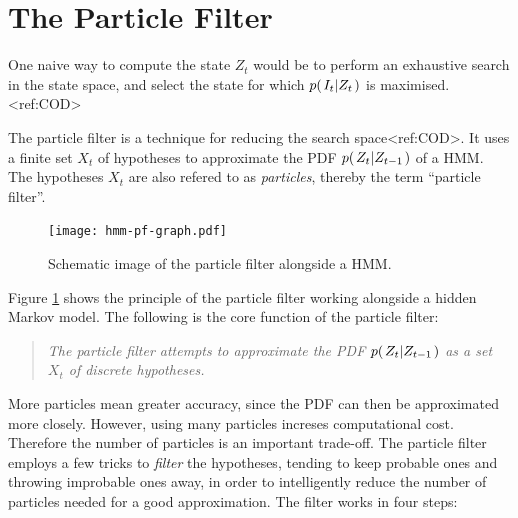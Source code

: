 %
%

%
%

%
%


\section{The Particle Filter}

One naive way to compute the state $Z_t$ would be to perform an
exhaustive search in the state space, and select the state for which
$p{(\left. I_t \middle\vert Z_t \right.)}$ is maximised.<ref:COD>

The particle filter is a technique for reducing the search
space<ref:COD>. It uses a finite set $X_t$ of hypotheses to
approximate the PDF $p{(\left. Z_t \middle\vert Z_{t-1} \right.)}$ of a HMM. The hypotheses $X_t$ are
also refered to as \emph{particles}, thereby the term ``particle
filter''.

\begin{figure}
  \centering
  \texttt{[image: hmm-pf-graph.pdf]}
  \caption{Schematic image of the particle filter alongside a HMM.}
  \label{fig:hmm-graph}
\end{figure}

Figure \ref{fig:hmm-graph} shows the principle of the particle filter
working alongside a hidden Markov model. The following is the core
function of the particle filter:

\begin{quote}
  \emph{The particle filter attempts to approximate the PDF
    $p{(\left. Z_t \middle\vert Z_{t-1} \right.)}$ as a set $X_t$ of discrete hypotheses.}
\end{quote}

More particles mean greater accuracy, since the PDF can then be
approximated more closely. However, using many particles increses
computational cost.  Therefore the number of particles is an important
trade-off.  The particle filter employs a few tricks to \emph{filter}
the hypotheses, tending to keep probable ones and throwing improbable
ones away, in order to intelligently reduce the number of particles
needed for a good approximation. The filter works in four steps:

